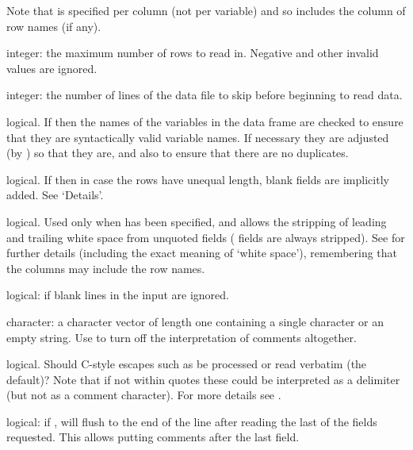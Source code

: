 \begin{Arguments}
\begin{ldescription}
Note that  is specified per column (not per
variable) and so includes the column of row names (if any).


\item[\code{nrows}] integer: the maximum number of rows to read in.  Negative
and other invalid values are ignored.

\item[\code{skip}] integer: the number of lines of the data file to skip before
beginning to read data.

\item[\code{check.names}] logical.  If  then the names of the
variables in the data frame are checked to ensure that they are
syntactically valid variable names.  If necessary they are adjusted
(by ) so that they are, and also to ensure
that there are no duplicates.

\item[\code{fill}] logical. If  then in case the rows have unequal
length, blank fields are implicitly added.  See `Details'.

\item[\code{strip.white}] logical. Used only when  has
been specified, and allows the stripping of leading and trailing
white space from unquoted  fields ( fields
are always stripped).  See  for further details
(including the exact meaning of `white space'),
remembering that the columns may include the row names.

\item[\code{blank.lines.skip}] logical: if  blank lines in the
input are ignored.

\item[\code{comment.char}] character: a character vector of length one
containing a single character or an empty string.  Use  to
turn off the interpretation of comments altogether.

\item[\code{allowEscapes}] logical.  Should C-style escapes such as
 be processed or read verbatim (the default)?   Note that if
not within quotes these could be interpreted as a delimiter (but not
as a comment character).  For more details see .

\item[\code{flush}] logical: if ,  will flush to the
end of the line after reading the last of the fields requested.
This allows putting comments after the last field.


\end{ldescription}
\end{Arguments}
